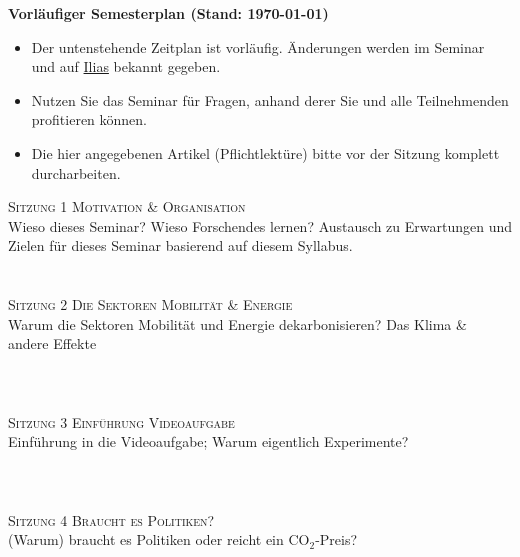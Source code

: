 \documentclass[12pt,a4paper]{article}
\begin{document}
\medskip
\noindent \textbf{Vorläufiger Semesterplan (Stand: \today)}
\begin{itemize}
    \item Der untenstehende Zeitplan ist vorläufig. Änderungen werden im Seminar und auf \href{https://ilias.unibe.ch/goto_ilias3_unibe_crs_3414477.html}{Ilias} bekannt gegeben.
    \item Nutzen Sie das Seminar für Fragen, anhand derer Sie und alle Teilnehmenden profitieren können. 
    \smallskip 
\item Die hier angegebenen Artikel (Pflichtlektüre) bitte vor der Sitzung komplett durcharbeiten. 
\end{itemize}
\medskip
\textsc{Sitzung 1 \dotfill Motivation \& Organisation} \smallskip \\ 
{\color{darkgreen}{\Rectangle}} Wieso dieses Seminar? Wieso Forschendes lernen? Austausch zu Erwartungen und Zielen für dieses Seminar basierend auf diesem Syllabus. \\
{\color{darkgreen}{\Rectangle}} 
\\ 
\medskip  \\	


\textsc{Sitzung 2 \dotfill Die Sektoren Mobilität \& Energie}  \smallskip \\ 
{\color{darkgreen}{\Rectangle}} Warum die Sektoren Mobilität und Energie dekarbonisieren? Das Klima \&  andere Effekte\\
{\color{darkgreen}{\Rectangle}}   \\ 
{\color{darkgreen}{\Rectangle}}  \\
\medskip  \\	


\textsc{Sitzung 3 \dotfill Einführung Videoaufgabe} \smallskip \\ 
{\color{darkgreen}{\Rectangle}} Einführung in die Videoaufgabe; Warum eigentlich Experimente?\\ 
{\color{darkgreen}{\Rectangle}}  \\ 
 {\color{darkgreen}{\Rectangle}}  \\ 
\medskip  \\	


\textsc{Sitzung 4 \dotfill Braucht es Politiken?} \smallskip \\ 
{\color{darkgreen}{\Rectangle}} (Warum) braucht es Politiken oder reicht ein CO$_2$-Preis?\\ 
{\color{darkgreen}{\Rectangle}}  \\ 
{\color{darkgreen}{\Rectangle}}    \\ 
\medskip  \\	
\end{document}
